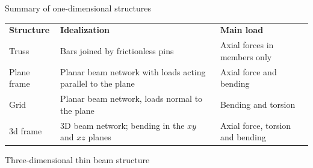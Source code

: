 \documentclass[aspectratio=169]{beamer}
\begin{document}
{\begin{frame}{Summary of one-dimensional structures}
    \vspace{0.5cm}

    \begin{tabular}{|p{1.7cm}|p{6cm}|p{5cm}|}
      \hline
      \rowcolor{darkred!20}\textbf{Structure} & \textbf{Idealization}                                       & \textbf{Main load}               \\
      Truss                                   & Bars joined by frictionless pins                            & Axial forces in members only     \\
      \hline
      Plane frame                             & Planar beam network with loads acting parallel to the plane & Axial force and bending          \\
      \hline
      Grid                                    & Planar beam network, loads normal to the plane              & Bending and torsion              \\
      \hline
      3d frame                                & 3D beam network; bending in the $xy$ and $xz$ planes        & Axial force, torsion and bending \\
      \hline
    \end{tabular}
  \end{frame}

  \begin{frame}{Three-dimensional thin beam structure}
    \begin{center}
\end{center}
\end{frame}}
\end{document}
